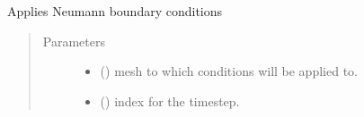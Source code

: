 \documentclass[letterpaper,10pt,english]{sphinxmanual}
\begin{document}
\begin{fulllineitems}
\label{\detokenize{solver:solver.apply_neumann_bc}}
\sphinxAtStartPar
Applies Neumann boundary conditions
\begin{quote}\begin{description}
\item[{Parameters}] \leavevmode\begin{itemize}
\item {} 
\sphinxAtStartPar
{} (\sphinxstyleliteralemphasis{\sphinxupquote{{[}}}\sphinxstyleliteralemphasis{\sphinxupquote{{]}}}) \textendash{} mesh to which conditions will be applied to.

\item {} 
\sphinxAtStartPar
{} (\sphinxstyleliteralemphasis{\sphinxupquote{{[}}}\sphinxstyleliteralemphasis{\sphinxupquote{{]}}}) \textendash{} index for the timestep.

\end{itemize}

\end{description}\end{quote}

\end{fulllineitems}

\end{document}
